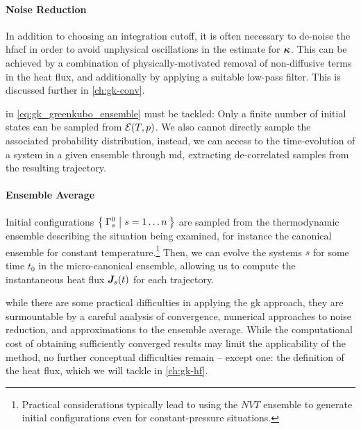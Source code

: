\paragraph{Noise Reduction} In addition to choosing an integration cutoff, it is often necessary to de-noise the \gls{hfacf} in order to avoid unphysical oscillations in the estimate for $\boldsymbol{\kappa}$. This can be achieved by a combination of physically-motivated removal of non-diffusive terms in the heat flux, and additionally by applying a suitable low-pass filter. This is discussed further in \cref{ch:gk-conv}.

 in \cref{eq:gk_greenkubo_ensemble} must be tackled: Only a finite number of initial states can be sampled from $\mathcal{E}(T, p)$. We also cannot directly sample the associated probability distribution, instead, we can access to the time-evolution of a system in a given ensemble through \gls{md}, extracting de-correlated samples from the resulting trajectory.

\paragraph{Ensemble Average} Initial configurations $\Set{\Gamma^0_s | s = 1 \ldots n}$ are sampled from the thermodynamic ensemble describing the situation being examined, for instance the canonical ensemble for constant temperature.\footnote{Practical considerations typically lead to using the $NVT$ ensemble to generate initial configurations even for constant-pressure situations.} Then, we can evolve the systems $s$ for some time $t_0$ in the micro-canonical ensemble, allowing us to compute the instantaneous heat flux $\boldsymbol{J}_s(t)$ for each trajectory.

 while there are some practical difficulties in applying the \gls{gk} approach, they are surmountable by a careful analysis of convergence, numerical approaches to noise reduction, and approximations to the ensemble average. While the computational cost of obtaining sufficiently converged results may limit the applicability of the method, no further conceptual difficulties remain -- except one: the definition of the heat flux, which we will tackle in \cref{ch:gk-hf}.

